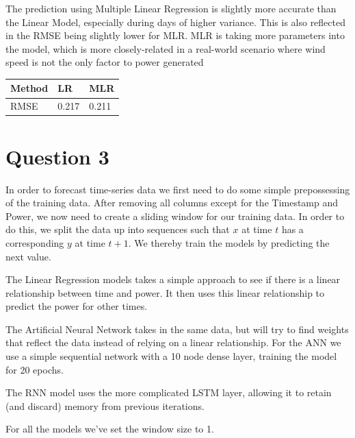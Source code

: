 \documentclass[a4paper, article, oneside, USenglish, IN5460]{memoir}
\begin{document}
The prediction using Multiple Linear Regression is slightly more accurate than the Linear Model, especially during days of higher variance. This is also reflected in the RMSE being slightly lower for MLR. MLR is taking more parameters into the model, which is more closely-related in a real-world scenario where wind speed is not the only factor to power generated 

\begin{table}[H]\centering
\begin{tabular}{|l|l|l|}
\hline
Method & LR & MLR  \\ \hline
RMSE   & 0.217  & 0.211    \\ \hline
\end{tabular}
\end{table}


\chapter*{Question 3}
In order to forecast time-series data we first need to do some simple prepossessing of the training data. After removing all columns except for the Timestamp and Power, we now need to create a sliding window for our training data. In order to do this, we split the data up into sequences such that $x$ at time $t$ has a corresponding $y$ at time $t+1$. We thereby train the models by predicting the next value.

The Linear Regression models takes a simple approach to see if there is a linear relationship between time and power. It then uses this linear relationship to predict the power for other times.

The Artificial Neural Network takes in the same data, but will try to find weights that reflect the data instead of relying on a linear relationship. For the ANN we use a simple sequential network with a 10 node dense layer, training the model for 20 epochs.

The RNN model uses the more complicated LSTM layer, allowing it to retain (and discard) memory from previous iterations.

For all the models we've set the window size to 1.
\end{document}
